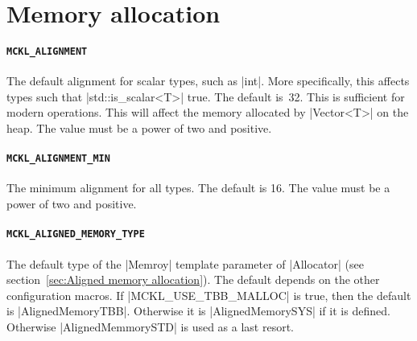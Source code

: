 \section{Memory allocation}
\label{sec:Memory allocation}

\paragraph{\texttt{MCKL\_ALIGNMENT}} The default alignment for scalar types,
such as |int|. More specifically, this affects types such that
|std::is_scalar<T>| true. The default is~32. This is sufficient for modern
\simd operations. This will affect the memory allocated by |Vector<T>| on the
heap. The value must be a power of two and positive.

\paragraph{\texttt{MCKL\_ALIGNMENT\_MIN}} The minimum alignment for all types.
The default is 16. The value must be a power of two and positive.

\paragraph{\texttt{MCKL\_ALIGNED\_MEMORY\_TYPE}} The default type of the
|Memroy| template parameter of |Allocator| (see section~\ref{sec:Aligned memory
allocation}). The default depends on the other configuration macros. If
|MCKL_USE_TBB_MALLOC| is true, then the default is |AlignedMemoryTBB|.
Otherwise it is |AlignedMemorySYS| if it is defined. Otherwise
|AlignedMemmorySTD| is used as a last resort.


